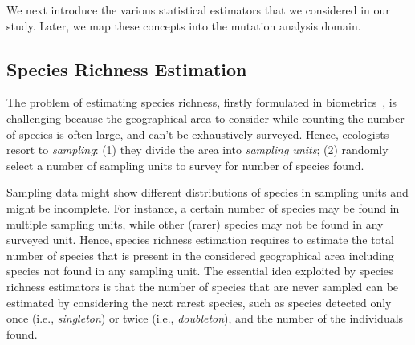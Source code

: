 \documentclass[sigconf,review,anonymous]{acmart}
\begin{document}
%

We next
introduce the various statistical estimators that we considered in our study.
%
%
Later, we map these concepts into the mutation analysis
domain.

\subsection{Species Richness Estimation}
\label{sec:statistical}
The problem of estimating species richness, firstly formulated in
biometrics~\cite{chao2016species}, is challenging because the geographical area
to consider while counting the number of species is often large, 
and can't be exhaustively surveyed.
%
Hence, ecologists resort to \emph{sampling}:
(1) they divide the area into \emph{sampling units}; %
%
(2) randomly select %
a number of sampling units to survey for number of species found.

Sampling data might show different distributions of species in sampling units
and might be incomplete.
%
For instance, a certain number of species may be found in multiple sampling units,
while other (rarer) species may not be found in any surveyed unit.
%
Hence, %
species richness estimation %
requires to estimate the total number of species that is present
in the considered geographical area including species not found in
any sampling unit.
The essential idea exploited by species richness estimators is that the number
of species that are never sampled %
can be estimated by considering the next rarest species, such as species
detected only once (i.e., \emph{singleton}) or twice (i.e., \emph{doubleton}), %
and the number of the individuals found. %
%
\end{document}
